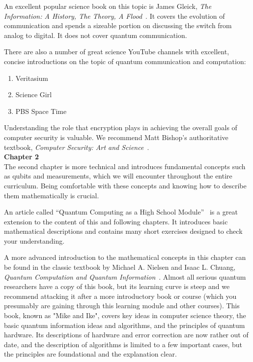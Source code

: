 An excellent popular science book on this topic is James Gleick, \emph{The Information: A History, The Theory, A Flood}~\cite{gleick2012information}. It covers the evolution of communication and spends a sizeable portion on discussing the switch from analog to digital. It does not cover quantum communication.

There are also a number of great science YouTube channels with excellent, concise introductions on the topic of quantum communication and computation:
\begin{enumerate}
    \item Veritasium
    \item Science Girl
    \item PBS Space Time
\end{enumerate}

Understanding the role that encryption plays in achieving the overall goals of computer security is valuable. We recommend Matt Bishop's authoritative textbook, \emph{Computer Security: Art and Science}~\cite{bishop2002art}. \\

\textbf{Chapter 2}\\

The second chapter is more technical and introduces fundamental concepts such as qubits and measurements, which we will encounter throughout the entire curriculum. Being comfortable with these concepts and knowing how to describe them mathematically is crucial.

An article called ``Quantum Computing as a High School Module''~\cite{perry2019quantum} is a great extension to the content of this and following chapters. It introduces basic mathematical descriptions and contains many short exercises designed to check your understanding.

A more advanced introduction to the mathematical concepts in this chapter can be found in the classic textbook by Michael A. Nielsen and Isaac L. Chuang, \emph{Quantum Computation and Quantum Information}~\cite{nielsen-chuang:qci}. Almost all serious quantum researchers have a copy of this book, but its learning curve is steep and we recommend attacking it after a more introductory book or course (which you presumably are gaining through this learning module and other courses). This book, known as "Mike and Ike", covers key ideas in computer science theory, the basic quantum information ideas and algorithms, and the principles of quantum hardware. Its descriptions of hardware and error correction are now rather out of date, and the description of algorithms is limited to a few important cases, but the principles are foundational and the explanation clear.

